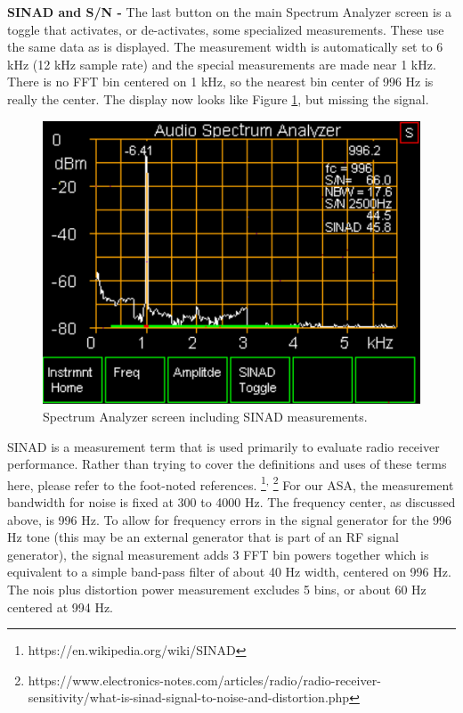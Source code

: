 \textbf{SINAD and S/N - }The last button on the main Spectrum Analyzer screen is a toggle that activates, or de-activates, some specialized measurements.  These use the same data as is displayed.  The measurement width is automatically set to 6 kHz (12 kHz sample rate) and the special measurements are made near 1 kHz.  There is no FFT bin centered on 1 kHz, so the nearest bin center of 996 Hz is really the center.  The display now looks like Figure \ref{AVNA_020-label}, but missing the signal.
%
\begin{figure}[H]
\begin{center}
\includegraphics[scale=0.75]{./images/AVNA_020.pdf}
\caption{Spectrum Analyzer screen including SINAD measurements.}
\label{AVNA_020-label}
\end{center}
\end{figure}
%

SINAD is a measurement term that is used primarily to evaluate radio receiver performance.  Rather than trying to cover the definitions and uses of these terms here, please refer to the foot-noted references.
%
\footnote{https://en.wikipedia.org/wiki/SINAD}\textsuperscript{,}
%
\footnote{https://www.electronics-notes.com/articles/radio/radio-receiver-sensitivity/what-is-sinad-signal-to-noise-and-distortion.php}
%
For our ASA, the measurement bandwidth for noise is fixed at 300 to 4000 Hz.  The frequency center, as discussed above, is 996 Hz.  To allow for frequency errors in the signal generator for the 996 Hz tone (this may be an external generator that is part of an RF signal generator), the signal measurement adds 3 FFT bin powers together which is equivalent to a simple band-pass filter of about 40 Hz width, centered on 996 Hz.  The nois plus distortion power measurement excludes 5 bins, or about 60 Hz centered at 994 Hz.

